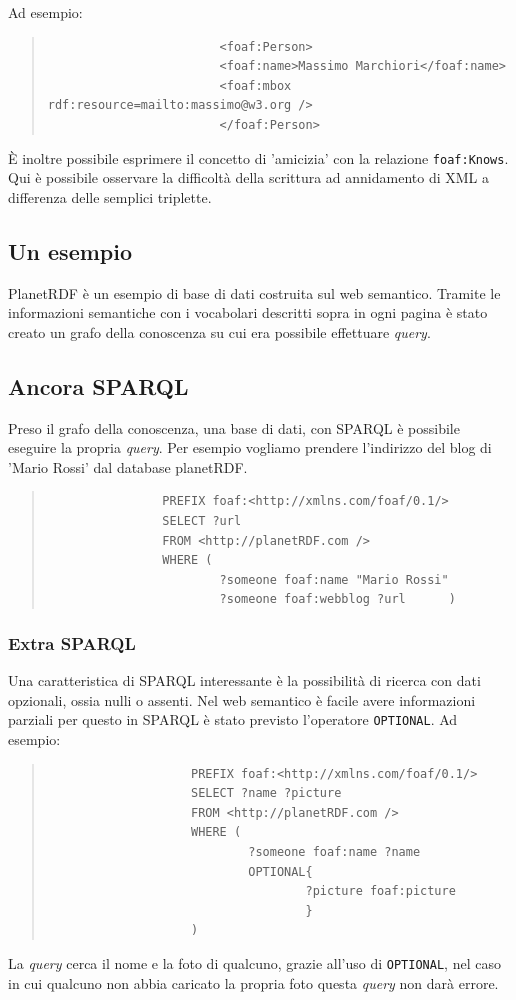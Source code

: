 					Ad esempio:
					\begin{quote}
					\begin{verbatim}
						<foaf:Person>
						<foaf:name>Massimo Marchiori</foaf:name>
						<foaf:mbox rdf:resource=mailto:massimo@w3.org />
						</foaf:Person>
					\end{verbatim}
					\end{quote}	
					È inoltre possibile esprimere il concetto di 'amicizia' con la relazione \verb|foaf:Knows|. Qui è possibile osservare la difficoltà della scrittura ad annidamento di XML a differenza delle semplici triplette.
					
		\subsection{Un esempio}
			 PlanetRDF è un esempio di base di dati costruita sul web semantico. Tramite le informazioni semantiche con i vocabolari descritti sopra in ogni pagina è stato creato un grafo della conoscenza su cui era possibile effettuare \emph{query}.
		 
		 \subsection{Ancora SPARQL}
		 	Preso il grafo della conoscenza, una base di dati, con SPARQL è possibile eseguire la propria \emph{query}. Per esempio vogliamo prendere l'indirizzo del blog di 'Mario Rossi' dal database planetRDF.
		 	\begin{quote}
		 	\begin{verbatim}
		 		PREFIX foaf:<http://xmlns.com/foaf/0.1/>
		 		SELECT ?url
		 		FROM <http://planetRDF.com />
		 		WHERE (
		 				?someone foaf:name "Mario Rossi"
		 				?someone foaf:webblog ?url		)
		 	\end{verbatim}
			\end{quote}
			
			\subsubsection{Extra SPARQL}
				Una caratteristica di SPARQL interessante è la possibilità di ricerca con dati opzionali, ossia nulli o assenti. Nel web semantico è facile avere informazioni parziali per questo in SPARQL è stato previsto l'operatore \verb|OPTIONAL|. Ad esempio:
				\begin{quote}
				\begin{verbatim}
					PREFIX foaf:<http://xmlns.com/foaf/0.1/>
					SELECT ?name ?picture
					FROM <http://planetRDF.com />
					WHERE (
							?someone foaf:name ?name
							OPTIONAL{
									?picture foaf:picture
									}
					)
				\end{verbatim}
				\end{quote}
				La \emph{query} cerca il nome e la foto di qualcuno, grazie all'uso di \verb|OPTIONAL|, nel caso in cui qualcuno non abbia caricato la propria foto questa \emph{query} non darà errore.
		
